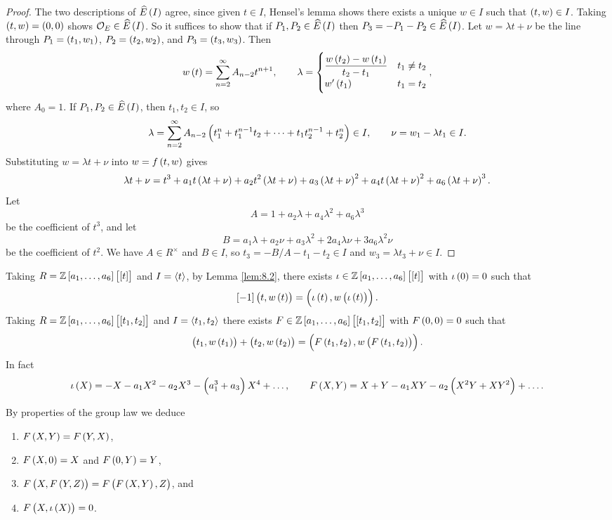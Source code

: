 \begin{proof}
The two descriptions of $ \widehat{E}\br{I} $ agree, since given $ t \in I $, Hensel's lemma shows there exists a unique $ w \in I $ such that $ \br{t, w} \in I $. Taking $ \br{t, w} = \br{0, 0} $ shows $ \OOO_E \in \widehat{E}\br{I} $. So it suffices to show that if $ P_1, P_2 \in \widehat{E}\br{I} $ then $ P_3 = -P_1 - P_2 \in \widehat{E}\br{I} $. Let $ w = \lambda t + \nu $ be the line through $ P_1 = \br{t_1, w_1} $, $ P_2 = \br{t_2, w_2} $, and $ P_3 = \br{t_3, w_3} $. Then
$$ w\br{t} = \sum_{n = 2}^\infty A_{n - 2}t^{n + 1}, \qquad \lambda =
\begin{cases}
\dfrac{w\br{t_2} - w\br{t_1}}{t_2 - t_1} & t_1 \ne t_2 \\
w'\br{t_1} & t_1 = t_2
\end{cases},
$$
where $ A_0 = 1 $. If $ P_1, P_2 \in \widehat{E}\br{I} $, then $ t_1, t_2 \in I $, so
$$ \lambda = \sum_{n = 2}^\infty A_{n - 2}\br{t_1^n + t_1^{n - 1}t_2 + \dots + t_1t_2^{n - 1} + t_2^n} \in I, \qquad \nu = w_1 - \lambda t_1 \in I. $$
Substituting $ w = \lambda t + \nu $ into $ w = f\br{t, w} $ gives
$$ \lambda t + \nu = t^3 + a_1t\br{\lambda t + \nu} + a_2t^2\br{\lambda t + \nu} + a_3\br{\lambda t + \nu}^2 + a_4t\br{\lambda t + \nu}^2 + a_6\br{\lambda t + \nu}^3. $$
Let
$$ A = 1 + a_2\lambda + a_4\lambda^2 + a_6\lambda^3 $$
be the coefficient of $ t^3 $, and let
$$ B = a_1\lambda + a_2\nu + a_3\lambda^2 + 2a_4\lambda\nu + 3a_6\lambda^2\nu $$
be the coefficient of $ t^2 $. We have $ A \in R^\times $ and $ B \in I $, so $ t_3 = -B / A - t_1 - t_2 \in I $ and $ w_3 = \lambda t_3 + \nu \in I $.
\end{proof}

Taking $ R = \ZZ\sbr{a_1, \dots, a_6}\sbr{\sbr{t}} $ and $ I = \left\langle t \right\rangle $, by Lemma \ref{lem:8.2}, there exists $ \iota \in \ZZ\sbr{a_1, \dots, a_6}\sbr{\sbr{t}} $ with $ \iota\br{0} = 0 $ such that
$$ \sbr{-1}\br{t, w\br{t}} = \br{\iota\br{t}, w\br{\iota\br{t}}}. $$
Taking $ R = \ZZ\sbr{a_1, \dots, a_6}\sbr{\sbr{t_1, t_2}} $ and $ I = \left\langle t_1, t_2 \right\rangle $ there exists $ F \in \ZZ\sbr{a_1, \dots, a_6}\sbr{\sbr{t_1, t_2}} $ with $ F\br{0, 0} = 0 $ such that
$$ \br{t_1, w\br{t_1}} + \br{t_2, w\br{t_2}} = \br{F\br{t_1, t_2}, w\br{F\br{t_1, t_2}}}. $$
In fact
$$ \iota\br{X} = -X - a_1X^2 - a_2X^3 - \br{a_1^3 + a_3}X^4 + \dots, \qquad F\br{X, Y} = X + Y - a_1XY - a_2\br{X^2Y + XY^2} + \dots. $$

\pagebreak

By properties of the group law we deduce
\begin{enumerate}
\item $ F\br{X, Y} = F\br{Y, X} $,
\item $ F\br{X, 0} = X $ and $ F\br{0, Y} = Y $,
\item $ F\br{X, F\br{Y, Z}} = F\br{F\br{X, Y}, Z} $, and
\item $ F\br{X, \iota\br{X}} = 0 $.
\end{enumerate}

